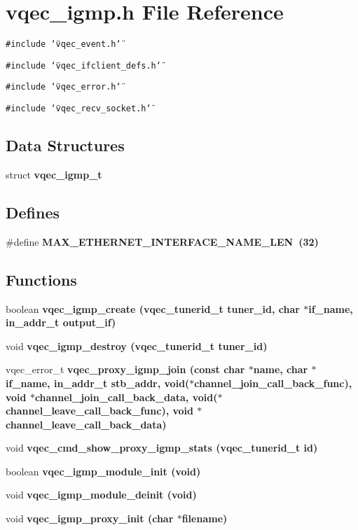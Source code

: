 \section{vqec\_\-igmp.h File Reference}
\label{vqec__igmp_8h}
{\tt \#include \char`\"{}vqec\_\-event.h\char`\"{}}\par
{\tt \#include \char`\"{}vqec\_\-ifclient\_\-defs.h\char`\"{}}\par
{\tt \#include \char`\"{}vqec\_\-error.h\char`\"{}}\par
{\tt \#include \char`\"{}vqec\_\-recv\_\-socket.h\char`\"{}}\par
\subsection*{Data Structures}
\begin{CompactItemize}
\item 
struct \bf{vqec\_\-igmp\_\-t}
\end{CompactItemize}
\subsection*{Defines}
\begin{CompactItemize}
\item 
\#define \bf{MAX\_\-ETHERNET\_\-INTERFACE\_\-NAME\_\-LEN}~(32)
\end{CompactItemize}
\subsection*{Functions}
\begin{CompactItemize}
\item 
boolean \bf{vqec\_\-igmp\_\-create} (vqec\_\-tunerid\_\-t tuner\_\-id, char $\ast$if\_\-name, in\_\-addr\_\-t output\_\-if)
\item 
void \bf{vqec\_\-igmp\_\-destroy} (vqec\_\-tunerid\_\-t tuner\_\-id)
\item 
vqec\_\-error\_\-t \bf{vqec\_\-proxy\_\-igmp\_\-join} (const char $\ast$name, char $\ast$if\_\-name, in\_\-addr\_\-t stb\_\-addr, void($\ast$channel\_\-join\_\-call\_\-back\_\-func), void $\ast$channel\_\-join\_\-call\_\-back\_\-data, void($\ast$channel\_\-leave\_\-call\_\-back\_\-func), void $\ast$channel\_\-leave\_\-call\_\-back\_\-data)
\item 
void \bf{vqec\_\-cmd\_\-show\_\-proxy\_\-igmp\_\-stats} (vqec\_\-tunerid\_\-t id)
\item 
boolean \bf{vqec\_\-igmp\_\-module\_\-init} (void)
\item 
void \bf{vqec\_\-igmp\_\-module\_\-deinit} (void)
\item 
void \bf{vqec\_\-igmp\_\-proxy\_\-init} (char $\ast$\bf{filename})
\end{CompactItemize}


